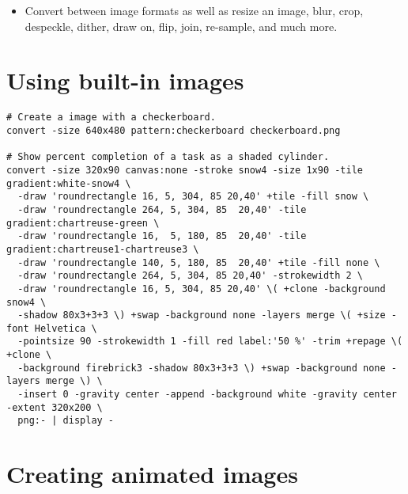 \begin{itemize}
\item Convert between image formats as well as resize an image, blur,
  crop, despeckle, dither, draw on, flip, join, re-sample, and much
  more.
\end{itemize}

\section{Using built-in images}

\begin{lstlisting}
# Create a image with a checkerboard.
convert -size 640x480 pattern:checkerboard checkerboard.png

# Show percent completion of a task as a shaded cylinder.
convert -size 320x90 canvas:none -stroke snow4 -size 1x90 -tile gradient:white-snow4 \
  -draw 'roundrectangle 16, 5, 304, 85 20,40' +tile -fill snow \
  -draw 'roundrectangle 264, 5, 304, 85  20,40' -tile gradient:chartreuse-green \
  -draw 'roundrectangle 16,  5, 180, 85  20,40' -tile gradient:chartreuse1-chartreuse3 \
  -draw 'roundrectangle 140, 5, 180, 85  20,40' +tile -fill none \
  -draw 'roundrectangle 264, 5, 304, 85 20,40' -strokewidth 2 \
  -draw 'roundrectangle 16, 5, 304, 85 20,40' \( +clone -background snow4 \
  -shadow 80x3+3+3 \) +swap -background none -layers merge \( +size -font Helvetica \
  -pointsize 90 -strokewidth 1 -fill red label:'50 %' -trim +repage \( +clone \
  -background firebrick3 -shadow 80x3+3+3 \) +swap -background none -layers merge \) \
  -insert 0 -gravity center -append -background white -gravity center -extent 320x200 \
  png:- | display -
\end{lstlisting}


\section{Creating animated images}

\label{animated}

